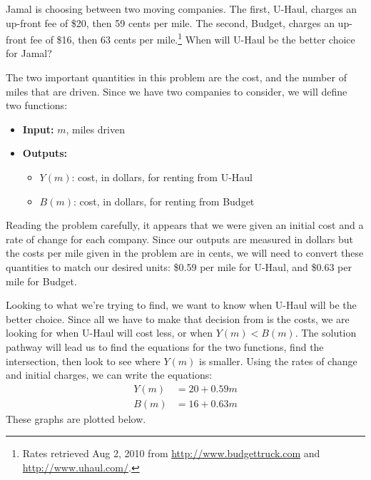 \begin{example}
Jamal is choosing between two moving companies. The first, U-Haul, charges an up-front fee of \$20, then 59 cents per mile. The second, Budget, charges an up-front fee of \$16, then 63 cents per mile.\footnote{Rates retrieved Aug 2, 2010 from \url{http://www.budgettruck.com} and \url{http://www.uhaul.com/}.} When will U-Haul be the better choice
for Jamal?

\begin{solution} The two important quantities in this problem are the cost, and the number of miles that are driven. Since we have two companies to consider, we will define two functions:
  \begin{itemize}
    \item[] {\bf Input:} $m$, miles driven
    \item[] {\bf Outputs:}
      \begin{itemize}
        \item[] $Y(m)$: cost, in dollars, for renting from U-Haul
        \item[] $B(m)$: cost, in dollars, for renting from Budget
      \end{itemize}
    \end{itemize}
Reading the problem carefully, it appears that we were given an initial cost and a rate of change for each company. Since our outputs are measured in dollars but the costs per mile given in the problem are in cents, we will need to convert these quantities to match our desired units: \$0.59 per mile for U-Haul, and \$0.63 per mile for Budget.

Looking to what we're trying to find, we want to know when U-Haul will be the better choice. Since all we have to make that decision from is the costs, we are looking for when U-Haul will cost less, or when $Y(m) < B(m)$. The solution pathway will lead us to find the equations for the two functions, find the intersection, then look to see where $Y(m)$ is smaller. Using the rates of change and initial charges, we can write the equations:
\begin{align*}
  Y(m) &= 20 + 0.59 m\\
  B(m) &= 16 + 0.63 m
\end{align*}
These graphs are plotted below.

\begin{center}
\end{center}
\end{solution}
\end{example}
